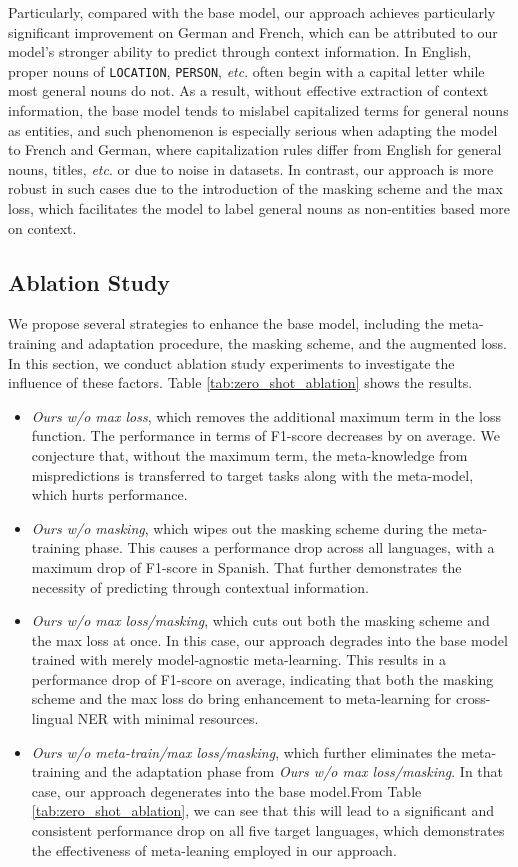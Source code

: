 \documentclass[letterpaper]{article} \usepackage{aaai20}  \usepackage{times}  \usepackage{helvet} \usepackage{courier}  \usepackage[hyphens]{url}  \usepackage{graphicx} \urlstyle{rm} \def\UrlFont{\rm}  \usepackage{graphicx}
\newcommand{\etc}{\textit{etc}}
\begin{document}
Particularly, compared with the base model, our approach achieves particularly significant improvement on German and French, which can be attributed to our model's stronger ability to predict through context information. 
In English, proper nouns of \texttt{LOCATION}, \texttt{PERSON}, \etc. often begin with a capital letter while most general nouns do not. 
As a result, without effective extraction of context information, the base model tends to mislabel capitalized terms for general nouns as entities, and such phenomenon is especially serious when adapting the model to French and German, where capitalization rules differ from English for general nouns, titles, \etc. or due to noise in datasets. 
In contrast, our approach is more robust in such cases due to the introduction of the masking scheme and the max loss, which facilitates the model to label general nouns as non-entities based more on context.

\subsection{Ablation Study}
We propose several strategies to enhance the base model, including the meta-training and adaptation procedure, the masking scheme, and the augmented loss.
In this section, we conduct ablation study experiments to investigate the influence of these factors. Table \ref{tab:zero_shot_ablation} shows the results. 

\begin{itemize}
    \item \textit{Ours w/o max loss}, which removes the additional maximum term in the loss function. The performance in terms of F1-score decreases by  on average. We conjecture that, without the maximum term, the meta-knowledge from mispredictions is transferred to target tasks along with the meta-model, which hurts performance.
    \item \textit{Ours w/o masking}, which wipes out the masking scheme during the meta-training phase. This causes a performance drop across all languages, with a maximum drop of  F1-score in Spanish. That further demonstrates the necessity of predicting through contextual information.
    \item \textit{Ours w/o max loss/masking}, which cuts out both the masking scheme and the max loss at once. In this case, our approach degrades into the base model trained with merely model-agnostic meta-learning. This results in a performance drop of  F1-score on average, indicating that both the masking scheme and the max loss do bring enhancement to meta-learning for cross-lingual NER with minimal resources.
    \item \textit{Ours w/o meta-train/max loss/masking}, which further eliminates the meta-training and the adaptation phase from \textit{Ours w/o max loss/masking}. In that case, our approach degenerates into the base model.From Table \ref{tab:zero_shot_ablation}, we can see that this will lead to a significant and consistent performance drop on all five target languages, which demonstrates the effectiveness of meta-leaning employed in our approach.
\end{itemize}
\end{document}

